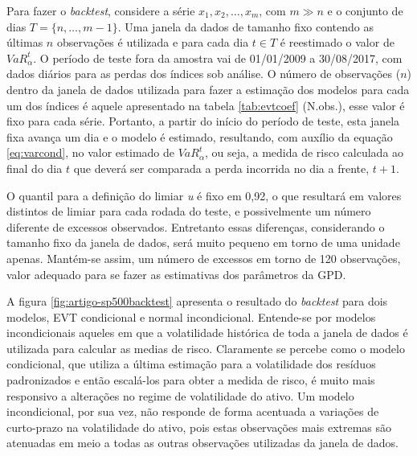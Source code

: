 \documentclass[review]{elsarticle}
\theoremstyle{definition}
\begin{document}
Para fazer o \emph{backtest}, considere a série $x_1, x_2, \ldots, x_m$, com $m\gg n$ e o conjunto de dias $T = \{n, \ldots, m-1\}$. Uma janela da dados de tamanho fixo contendo as últimas $n$ observações é utilizada e para cada dia $t \in T$ é reestimado o valor de $VaR^t_\alpha$. O período de teste fora da amostra vai de 01/01/2009 a 30/08/2017, com dados diários para as perdas dos índices sob análise. O número de observações ($n$) dentro da janela de dados utilizada para fazer a estimação dos modelos para cada um dos índices é aquele apresentado na tabela \ref{tab:evtcoef} (N.obs.), esse valor é fixo para cada série. Portanto, a partir do início do período de teste, esta janela fixa avança um dia e o modelo é estimado, resultando, com auxílio da equação \eqref{eq:varcond}, no valor estimado de $VaR_\alpha^t$, ou seja, a medida de risco calculada ao final do dia $t$ que deverá ser comparada a perda incorrida no dia a frente, $t+1$.

O quantil para a definição do limiar \emph{u} é fixo em 0,92, o que resultará em valores distintos de limiar para cada rodada do teste, e possivelmente um número diferente de excessos observados. Entretanto essas diferenças, considerando o tamanho fixo da janela de dados, será muito pequeno em torno de uma unidade apenas. Mantém-se assim, um número de excessos em torno de 120 observações, valor adequado para se fazer as estimativas dos parâmetros da GPD.

A figura \ref{fig:artigo-sp500backtest} apresenta o resultado do \emph{backtest} para dois modelos, EVT condicional e normal incondicional. Entende-se por modelos incondicionais aqueles em que a volatilidade histórica de toda a janela de dados é utilizada para calcular as medias de risco. Claramente se percebe como o modelo condicional, que utiliza a última estimação para a volatilidade dos resíduos padronizados e então escalá-los para obter a medida de risco, é muito mais responsivo a alterações no regime de volatilidade do ativo. Um modelo incondicional, por sua vez, não responde de forma acentuada a variações de curto-prazo na volatilidade do ativo, pois estas observações mais extremas são atenuadas em meio a todas as outras observações utilizadas da janela de dados.
\end{document}
